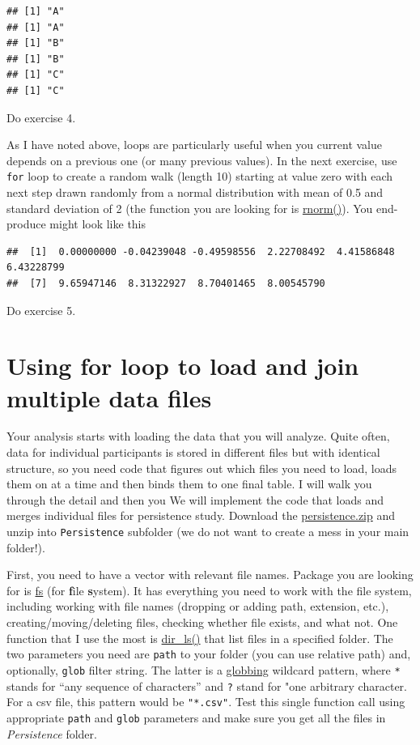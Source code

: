\documentclass[
]{book}
\begin{document}
\begin{verbatim}
## [1] "A"
## [1] "A"
## [1] "B"
## [1] "B"
## [1] "C"
## [1] "C"
\end{verbatim}

Do exercise 4.

As I have noted above, loops are particularly useful when you current value depends on a previous one (or many previous values). In the next exercise, use \texttt{for} loop to create a random walk (length 10) starting at value zero with each next step drawn randomly from a normal distribution with mean of 0.5 and standard deviation of 2 (the function you are looking for is \href{https://stat.ethz.ch/R-manual/R-devel/library/stats/html/Normal.html}{rnorm()}). You end-produce might look like this

\begin{verbatim}
##  [1]  0.00000000 -0.04239048 -0.49598556  2.22708492  4.41586848  6.43228799
##  [7]  9.65947146  8.31322927  8.70401465  8.00545790
\end{verbatim}

Do exercise 5.

\hypertarget{using-for-loop-to-load-and-join-multiple-data-files}{%
\section{Using for loop to load and join multiple data files}\label{using-for-loop-to-load-and-join-multiple-data-files}}

Your analysis starts with loading the data that you will analyze. Quite often, data for individual participants is stored in different files but with identical structure, so you need code that figures out which files you need to load, loads them on at a time and then binds them to one final table. I will walk you through the detail and then you We will implement the code that loads and merges individual files for persistence study. Download the \href{data/persistence.zip}{persistence.zip} and unzip into \texttt{Persistence} subfolder (we do not want to create a mess in your main folder!).

First, you need to have a vector with relevant file names. Package you are looking for is \href{https://github.com/r-lib/fs}{fs} (for \textbf{f}ile \textbf{s}ystem). It has everything you need to work with the file system, including working with file names (dropping or adding path, extension, etc.), creating/moving/deleting files, checking whether file exists, and what not. One function that I use the most is \href{https://www.rdocumentation.org/packages/fs/versions/1.5.0/topics/dir_ls}{dir\_ls()} that list files in a specified folder. The two parameters you need are \texttt{path} to your folder (you can use relative path) and, optionally, \texttt{glob} filter string. The latter is a \href{https://en.wikipedia.org/wiki/Glob_(programming)}{globbing} wildcard pattern, where \texttt{*} stands for ``any sequence of characters'' and \texttt{?} stand for "one arbitrary character. For a csv file, this pattern would be \texttt{"*.csv"}. Test this single function call using appropriate \texttt{path} and \texttt{glob} parameters and make sure you get all the files in \emph{Persistence} folder.
\end{document}

